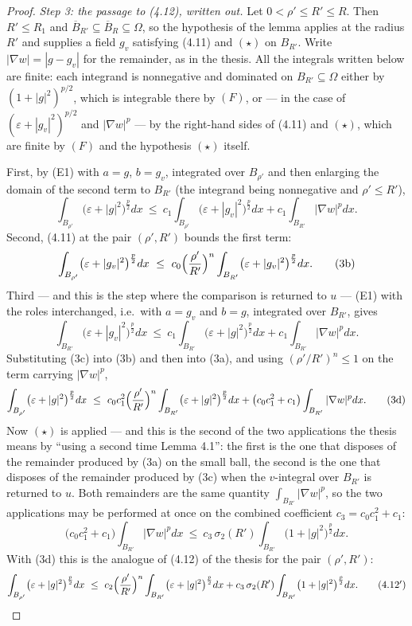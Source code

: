 \begin{proof}
\emph{Step 3: the passage to (4.12), written out.}  Let $0<\rho'\le R'\le R$.
Then $R'\le R_1$ and $\overline B_{R'}\subseteq\overline B_R\subseteq\Omega$, so
the hypothesis of the lemma applies at the radius $R'$ and supplies a field
$g_v$ satisfying (4.11) and $(\star)$ on $B_{R'}$.  Write $|\nabla w|=|g-g_v|$
for the remainder, as in the thesis.  All the integrals written below are finite:
each integrand is nonnegative and dominated on $B_{R'}\subseteq\Omega$ either by
$(1+|g|^2)^{p/2}$, which is integrable there by $(F)$, or --- in the case of
$(\varepsilon+|g_v|^2)^{p/2}$ and $|\nabla w|^p$ --- by the right-hand sides of
(4.11) and $(\star)$, which are finite by $(F)$ and the hypothesis $(\star)$
itself.

First, by (E1) with $a=g$, $b=g_v$, integrated over $B_{\rho'}$ and then
enlarging the domain of the second term to $B_{R'}$ (the integrand being
nonnegative and $\rho'\le R'$),
\[
\int_{B_{\rho'}}\bigl(\varepsilon+|g|^2\bigr)^{\frac p2}dx
\ \le\ c_1\int_{B_{\rho'}}\bigl(\varepsilon+|g_v|^2\bigr)^{\frac p2}dx
+c_1\int_{B_{R'}}|\nabla w|^{p}dx .
\tag{3a}
\]
Second, (4.11) at the pair $(\rho',R')$ bounds the first term:
\[
\int_{B_{\rho'}}\bigl(\varepsilon+|g_v|^2\bigr)^{\frac p2}dx
\ \le\ c_0\Bigl(\frac{\rho'}{R'}\Bigr)^{n}
\int_{B_{R'}}\bigl(\varepsilon+|g_v|^2\bigr)^{\frac p2}dx .
\tag{3b}
\]
Third --- and this is the step where the comparison is returned to $u$ --- (E1)
with the roles interchanged, i.e.\ with $a=g_v$ and $b=g$, integrated over
$B_{R'}$, gives
\[
\int_{B_{R'}}\bigl(\varepsilon+|g_v|^2\bigr)^{\frac p2}dx
\ \le\ c_1\int_{B_{R'}}\bigl(\varepsilon+|g|^2\bigr)^{\frac p2}dx
+c_1\int_{B_{R'}}|\nabla w|^{p}dx .
\tag{3c}
\]
Substituting (3c) into (3b) and then into (3a), and using
$(\rho'/R')^{n}\le1$ on the term carrying $|\nabla w|^p$,
\[
\int_{B_{\rho'}}\bigl(\varepsilon+|g|^2\bigr)^{\frac p2}dx
\ \le\ c_0c_1^2\Bigl(\frac{\rho'}{R'}\Bigr)^{n}
\int_{B_{R'}}\bigl(\varepsilon+|g|^2\bigr)^{\frac p2}dx
+\bigl(c_0c_1^2+c_1\bigr)\int_{B_{R'}}|\nabla w|^{p}dx .
\tag{3d}
\]
Now $(\star)$ is applied --- and this is the second of the two applications the
thesis means by ``using a second time Lemma 4.1'': the first is the one that
disposes of the remainder produced by (3a) on the small ball, the second is the
one that disposes of the remainder produced by (3c) when the $v$-integral over
$B_{R'}$ is returned to $u$.  Both remainders are the same quantity
$\int_{B_{R'}}|\nabla w|^p$, so the two applications may be performed at once on
the combined coefficient $c_3=c_0c_1^2+c_1$:
\[
\bigl(c_0c_1^2+c_1\bigr)\int_{B_{R'}}|\nabla w|^{p}dx
\ \le\ c_3\,\sigma_2(R')\int_{B_{R'}}\bigl(1+|g|^2\bigr)^{\frac p2}dx .
\]
With (3d) this is the analogue of (4.12) of the thesis for the pair $(\rho',R')$:
\[
\int_{B_{\rho'}}\bigl(\varepsilon+|g|^2\bigr)^{\frac p2}dx
\ \le\ c_2\Bigl(\frac{\rho'}{R'}\Bigr)^{n}
\int_{B_{R'}}\bigl(\varepsilon+|g|^2\bigr)^{\frac p2}dx
+c_3\,\sigma_2(R')\int_{B_{R'}}\bigl(1+|g|^2\bigr)^{\frac p2}dx .
\tag{4.12$'$}
\]


\end{proof}

